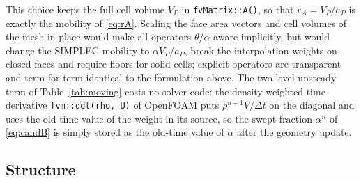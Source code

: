 \documentclass[11pt,a4paper]{article}
\theoremstyle{remark}
\newcommand{\dt}{\Delta t}
\newcommand{\code}[1]{\texttt{#1}}
\begin{document}
This choice keeps the full cell volume $V_P$ in \code{fvMatrix::A()}, so that
$r_A=V_P/a_P$ is exactly the mobility of \eqref{eq:rA}. Scaling the face area vectors and
cell volumes of the mesh in place would make all operators $\theta$/$\alpha$-aware
implicitly, but would change the SIMPLEC mobility to $\alpha V_P/a_P$, break the interpolation
weights on closed faces and require floors for solid cells; explicit operators are transparent
and term-for-term identical to the formulation above.
The two-level unsteady term of Table~\ref{tab:moving} costs no solver code: the density-weighted
time derivative \code{fvm::ddt(rho, U)} of OpenFOAM puts $\rho^{n+1}V/\dt$ on the diagonal and
uses the old-time value of the weight in its source, so the swept fraction $\alpha^n$ of
\eqref{eq:candB} is simply stored as the old-time value of $\alpha$ after the geometry update.

\subsection{Structure}
\end{document}
